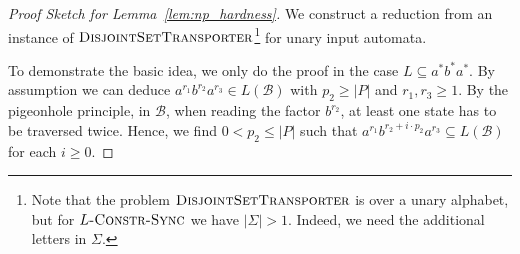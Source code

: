 \begin{proof}[Proof Sketch for Lemma~\ref{lem:np_hardness}]
 We construct a reduction from an instance
 of $\textsc{DisjointSetTransporter}$\footnote{Note that the problem $\textsc{DisjointSetTransporter}$ is over a unary alphabet, but for $L\textsc{-Constr-Sync}$
 we have $|\Sigma| > 1$. Indeed, we need the additional letters in $\Sigma$.}
 for unary input automata.
 
 To demonstrate the basic idea, we only do the proof
 in the case $L \subseteq a^* b^* a^*$.
 By assumption we can deduce $a^{r_1} b^{r_2} a^{r_3} \in L(\mathcal B)$
 with $p_2 \ge |P|$ and $r_1, r_3 \ge 1$.
 By the pigeonhole principle, in $\mathcal B$, 
 when reading the factor $b^{r_2}$, at least one state has to be traversed twice.
 Hence, we find $0 < p_2 \le |P|$ such that $a^{r_1} b^{r_2 + i\cdot p_2} a^{r_3}
 \subseteq L(\mathcal B)$ for each $i \ge 0$.



\end{proof}
